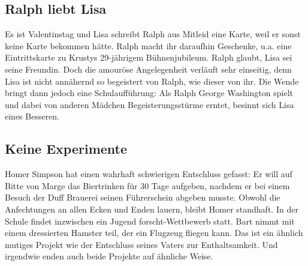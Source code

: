 
	
\subsection{Ralph liebt Lisa}\label{9F13}
Es ist Valentinstag und Lisa schreibt Ralph aus Mitleid eine Karte, weil er sonst keine Karte bekommen hätte. Ralph macht ihr daraufhin Geschenke, u.a. eine Eintrittskarte zu Krustys 29-jährigem Bühnenjubileum. Ralph glaubt, Lisa sei seine Freundin. Doch die amouröse Angelegenheit verläuft sehr einseitig, denn Lisa ist nicht annähernd so begeistert von Ralph, wie dieser von ihr. Die Wende bringt dann jedoch eine Schulaufführung: Als Ralph George Washington spielt und dabei von anderen Mädchen Begeisterungsstürme erntet, besinnt sich Lisa eines Besseren.


	
\subsection{Keine Experimente}
Homer Simpson hat einen wahrhaft schwierigen Entschluss gefasst: Er will auf Bitte von Marge das Biertrinken für 30 Tage aufgeben, nachdem er bei einem Besuch der Duff Brauerei seinen Führerschein abgeben musste. Obwohl die Anfechtungen an allen Ecken und Enden lauern, bleibt Homer standhaft. In der Schule findet inzwischen ein \glqq Jugend forscht\grqq -Wettbewerb statt. Bart nimmt mit einem dressierten Hamster teil, der ein Flugzeug fliegen kann. Das ist ein ähnlich mutiges Projekt wie der Entschluss seines Vaters zur Enthaltsamkeit. Und irgendwie enden auch beide Projekte auf ähnliche Weise.

